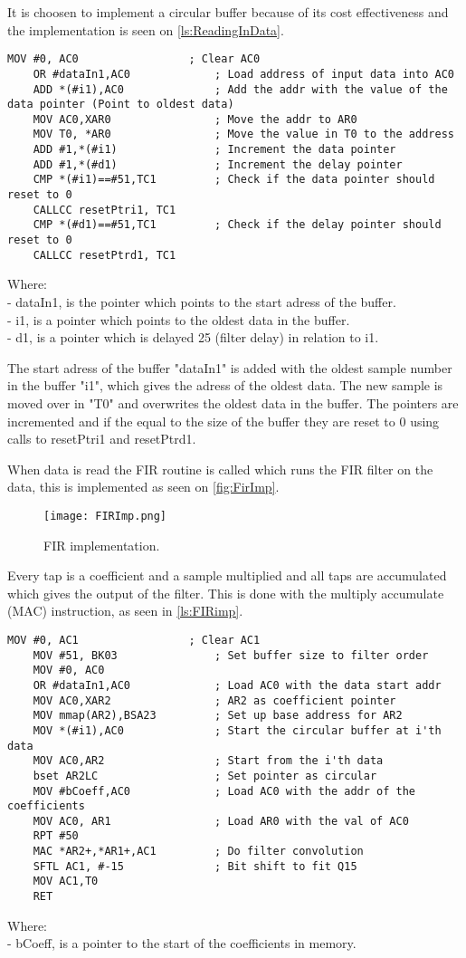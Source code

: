 It is choosen to implement a circular buffer because of its cost effectiveness and the implementation is seen on \autoref{ls:ReadingInData}.
\begin{lstlisting}[language={[x86masm]Assembler}, caption = {Reading data in},label={ls:ReadingInData}]
	MOV #0, AC0					; Clear AC0
	OR #dataIn1,AC0				; Load address of input data into AC0
	ADD *(#i1),AC0				; Add the addr with the value of the data pointer (Point to oldest data)
	MOV AC0,XAR0				; Move the addr to AR0
	MOV T0, *AR0				; Move the value in T0 to the address
	ADD #1,*(#i1)				; Increment the data pointer
	ADD #1,*(#d1)				; Increment the delay pointer
	CMP *(#i1)==#51,TC1			; Check if the data pointer should reset to 0
	CALLCC resetPtri1, TC1
	CMP *(#d1)==#51,TC1			; Check if the delay pointer should reset to 0
	CALLCC resetPtrd1, TC1
\end{lstlisting}
Where: \\
- dataIn1, is the pointer which points to the start adress of the buffer. \\
- i1, is a pointer which points to the oldest data in the buffer. \\
- d1, is a pointer which is delayed 25 (filter delay) in relation to i1. 

The start adress of the buffer "dataIn1" is added with the oldest sample number in the buffer "i1", which gives the adress of the oldest data. The new sample is moved over in "T0" and overwrites the oldest data in the buffer. The pointers are incremented and if the equal to the size of the buffer they are reset to 0 using calls to resetPtri1 and resetPtrd1.

When data is read the FIR routine is called which runs the FIR filter on the data, this is implemented as seen on \autoref{fig:FirImp}.
\begin{figure}[H]
\centering
\texttt{[image: FIRImp.png]}
\caption{FIR implementation.}
\label{fig:FirImp}
\end{figure}

Every tap is a coefficient and a sample multiplied and all taps are accumulated which gives the output of the filter. This is done with the multiply accumulate (MAC) instruction, as seen in \autoref{ls:FIRimp}.
\begin{lstlisting}[language={[x86masm]Assembler}, caption = {FIR algorithm.},label={ls:FIRimp}]
	MOV #0, AC1					; Clear AC1
	MOV #51, BK03				; Set buffer size to filter order
	MOV #0, AC0
	OR #dataIn1,AC0				; Load AC0 with the data start addr
	MOV AC0,XAR2				; AR2 as coefficient pointer
	MOV mmap(AR2),BSA23        	; Set up base address for AR2
	MOV *(#i1),AC0				; Start the circular buffer at i'th data
	MOV AC0,AR2					; Start from the i'th data
	bset AR2LC					; Set pointer as circular
	MOV #bCoeff,AC0				; Load AC0 with the addr of the coefficients
	MOV AC0, AR1				; Load AR0 with the val of AC0
	RPT #50						
	MAC *AR2+,*AR1+,AC1 		; Do filter convolution
	SFTL AC1, #-15				; Bit shift to fit Q15
	MOV AC1,T0     				
	RET
\end{lstlisting}
Where: \\
- bCoeff, is a pointer to the start of the coefficients in memory. 


